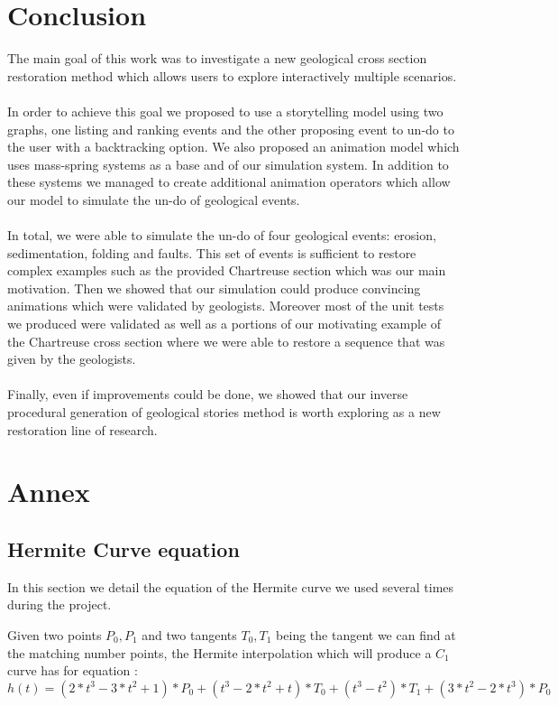 \documentclass[12pt, a4paper]{report} %
\begin{document}
\chapter{Conclusion}
The main goal of this work was to investigate a new geological cross section restoration method which allows users to explore interactively multiple scenarios. \\\\
In order to achieve this goal we proposed to use a storytelling model using two graphs, one listing and ranking events and the other proposing event to un-do to the user with a backtracking option. We  also proposed an animation model which uses mass-spring systems as a base and of our simulation system. In addition to these systems we managed to create additional animation operators which allow our model to simulate the un-do of geological events.\\\\ In total, we were able to simulate the un-do of four geological events: erosion, sedimentation, folding and faults. This set of events is sufficient to restore complex examples such as the provided Chartreuse section which was our main motivation.
 Then we showed that our simulation could produce convincing animations which were validated by geologists. Moreover most of the unit tests we produced were validated as well as a portions of our motivating example of the Chartreuse cross section where we were able to restore a sequence that was given by the geologists.\\\\
 Finally, even if improvements could be done, we showed that our inverse procedural generation of geological stories method is worth exploring as a new restoration line of research.




\chapter{Annex}

\section{Hermite Curve equation}
In this section we detail the equation of the Hermite curve we used several times during the project.

Given two points $P_0, P_1$ and two tangents $T_0, T_1$ being the tangent we can find at the matching number points, the Hermite interpolation which will produce a $C_1$ curve has for equation : 
\begin{equation}
h(t) = (2*t^3 - 3*t^2 + 1)*P_0 + (t^3 - 2*t^2 + t)*T_0 + (t^3 -t^2)*T_1 +(3*t^2 - 2*t^3)*P_0
\end{equation}
\end{document}
